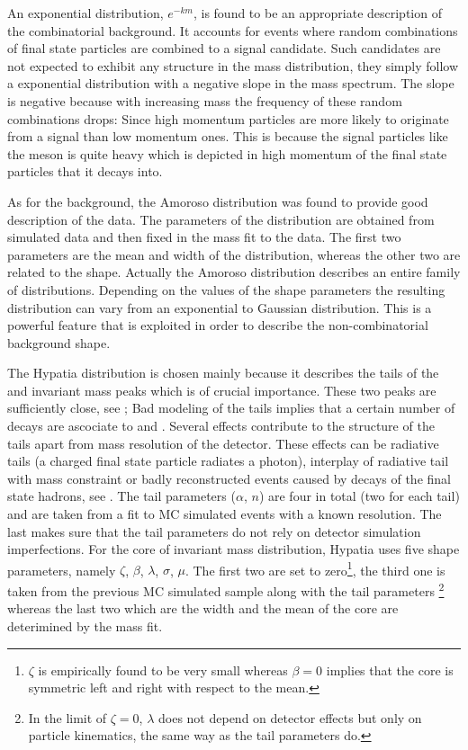\noindent An exponential distribution, $e^{-km}$, is found to be an appropriate description of the combinatorial background. It  accounts
for events where random combinations of final state particles are combined to a signal candidate. Such candidates are not expected to
exhibit any structure in the mass distribution, they simply follow a exponential distribution with a negative slope in the mass spectrum.
The slope is negative because with increasing mass the frequency of these random combinations drops: Since high momentum particles are more
likely to originate from a signal than low momentum ones. This is because the signal particles like the \Bs meson is quite heavy which is
depicted in high momentum of the final state particles that it decays into.

As for the \LbJpsippi background, the Amoroso distribution was found to provide good description of the data.
The parameters of the distribution are obtained from simulated data and then fixed in the mass fit to the data. The first two parameters
are the mean and width of the distribution, whereas the other two are related to the shape. Actually the Amoroso distribution describes
an entire family of distributions. Depending on the values of the shape parameters the resulting distribution can vary from an exponential
to Gaussian distribution. This is a powerful feature that is exploited in order to describe the \LbJpsippi non-combinatorial background shape.

The Hypatia distribution is chosen mainly because it describes the tails of the \Bs and \Bd invariant mass peaks which is
of crucial importance. These two peaks are sufficiently close, see ; Bad modeling of the tails implies
that a certain number of \Bd decays are ascociate to \Bs and \viceversa. Several effects contribute to the structure of the tails apart
from mass resolution of the detector. These effects can be radiative tails (a charged final state particle radiates a photon), interplay of
radiative tail with \jpsi mass constraint or badly reconstructed events caused by decays of the final state hadrons, see \cite{Santos:2013gra}.
The tail parameters ($\alpha$, $n$) are four in total (two for each tail) and are taken from a fit to MC simulated events with a known resolution.
The last makes sure that the tail parameters do not rely on detector simulation imperfections.
For the core of invariant mass distribution, Hypatia uses five shape parameters, namely $\zeta$, $\beta$, $\lambda$, $\sigma$, $\mu$.
The first two are set to zero\footnote{$\zeta$ is empirically found to be very small whereas
$\beta = 0$ implies that the core is symmetric left and right with respect to the mean.}, the third one is taken from the previous
MC simulated sample along with the tail parameters \footnote{In the limit of $\zeta = 0$, $\lambda$ does not depend on detector
effects but only on particle kinematics, the same way as the tail parameters do.} whereas the last two which are the width and
the mean of the core are deterimined by the mass fit.

